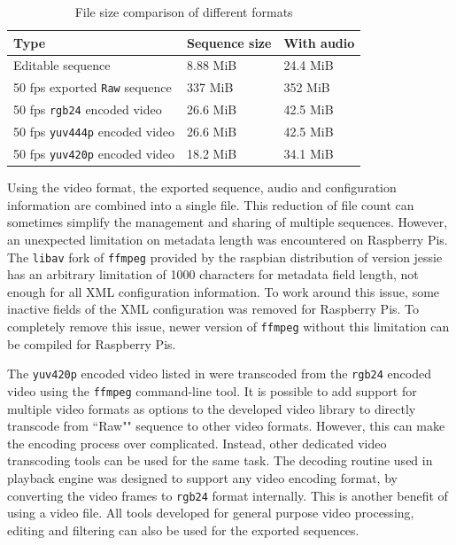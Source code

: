 \begin{table}[t]
  \centering
  \begin{tabular}{l|l|l}
    \hline
    \textbf{Type} & \textbf{Sequence size} & \textbf{With audio} \\
    \hline
    Editable sequence                     & 8.88 MiB  & 24.4 MiB  \\ \hline
    50 fps exported \texttt{Raw} sequence & 337 MiB   & 352 MiB   \\ \hline
    50 fps \texttt{rgb24} encoded video   & 26.6 MiB  & 42.5 MiB  \\ \hline
    50 fps \texttt{yuv444p} encoded video & 26.6 MiB  & 42.5 MiB  \\ \hline
    50 fps \texttt{yuv420p} encoded video & 18.2 MiB  & 34.1 MiB  \\ \hline
  \end{tabular}
  \caption{\footnotesize File size comparison of different formats}
  \label{tbl:size}
\end{table}

Using the video format, the exported sequence, audio and configuration information are combined into a single file. This reduction of file count can sometimes simplify the management and sharing of multiple sequences. However, an unexpected limitation on metadata length was encountered on Raspberry Pis. The \texttt{libav} fork of \texttt{ffmpeg} provided by the raspbian distribution of version jessie has an arbitrary limitation of 1000 characters for metadata field length, not enough for all XML configuration information. To work around this issue, some inactive fields of the XML configuration was removed for Raspberry Pis. To completely remove this issue, newer version of \texttt{ffmpeg} without this limitation can be compiled for Raspberry Pis.

The \texttt{yuv420p} encoded video listed in  were transcoded from the \texttt{rgb24} encoded video using the \texttt{ffmpeg} command-line tool. It is possible to add support for multiple video formats as options to the developed video library to directly transcode from ``Raw"" sequence to other video formats. However, this can make the encoding process over complicated. Instead, other dedicated video transcoding tools can be used for the same task. The decoding routine used in playback engine was designed to support any video encoding format, by converting the video frames to \texttt{rgb24} format internally. This is another benefit of using a video file. All tools developed for general purpose video processing, editing and filtering can also be used for the exported sequences.

